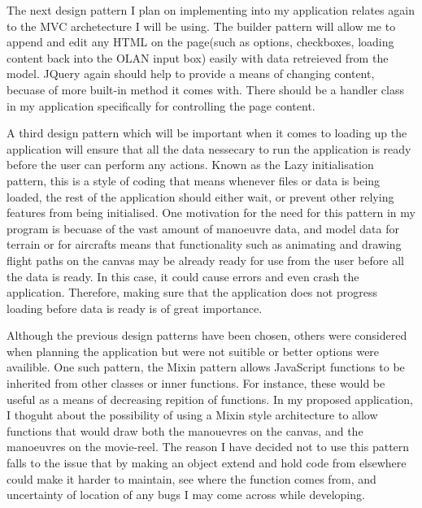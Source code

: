 The next design pattern I plan on implementing into my application relates again to the MVC archetecture I will be using. The builder pattern will allow me to append and edit any HTML on the page(such as options, checkboxes, loading content back into the OLAN input box) easily with data retreieved from the model. JQuery again should help to provide a means of changing content, becuase of more built-in method it comes with. There should be a handler class in my application specifically for controlling the page content.

A third design pattern which will be important when it comes to loading up the application will ensure that all the data nessecary to run the application is ready before the user can perform any actions. Known as the Lazy initialisation pattern, this is a style of coding that means whenever files or data is being loaded, the rest of the application should either wait, or prevent other relying features from being initialised. One motivation for the need for this pattern in my program is becuase of the vast amount of manoeuvre data, and model data for terrain or for aircrafts means that functionality such as animating and drawing flight paths on the canvas may be already ready for use from the user before all the data is ready. In this case, it could cause errors and even crash the application. Therefore, making sure that the application does not progress loading before data is ready is of great importance.

Although the previous design patterns have been chosen, others were considered when planning the application but were not suitible or better options were availible. One such pattern, the Mixin pattern allows JavaScript functions to be inherited from other classes or inner functions. For instance, these would be useful as a means of decreasing repition of functions. In my proposed application, I thoguht about the possibility of using a Mixin style architecture to allow functions that would draw both the manouevres on the canvas, and the manoeuvres on the movie-reel. The reason I have decided not to use this pattern falls to the issue that by making an object extend and hold code from elsewhere could make it harder to maintain, see where the function comes from, and uncertainty of location of any bugs I may come across while developing.

